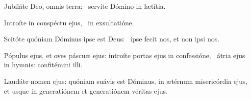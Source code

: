 \item Jubiláte Deo, omnis terra:~\psstar{} servíte Dómino in lætítia.

\item Introíte in conspéctu ejus,~\psstar{} in exsultatióne.

\item Scitóte quóniam Dóminus ipse est Deus:~\psstar{} ipse fecit nos, et non ipsi nos.

\item Pópulus ejus, et oves páscuæ ejus: introíte portas ejus in confessióne,~\psstar{} átria ejus in hymnis: confitémini illi.

\item Laudáte nomen ejus: quóniam suávis est Dóminus, in ætérnum misericórdia ejus,~\psstar{} et usque in generatiónem et generatiónem véritas ejus.